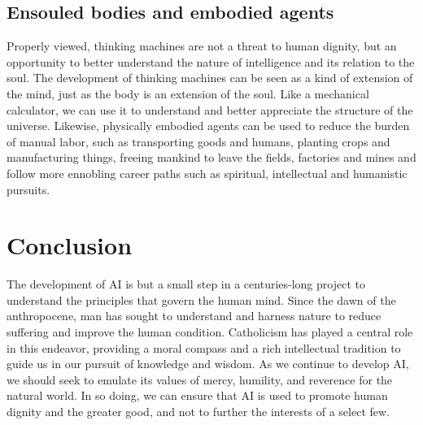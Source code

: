 \documentclass[sigplan,nonacm]{acmart}\settopmatter{printfolios=false,printccs=false,printacmref=false}
\begin{document}
  \subsection{Ensouled bodies and embodied agents}

  Properly viewed, thinking machines are not a threat to human dignity, but an opportunity to better understand the nature of intelligence and its relation to the soul. The development of thinking machines can be seen as a kind of extension of the mind, just as the body is an extension of the soul. Like a mechanical calculator, we can use it to understand and better appreciate the structure of the universe. Likewise, physically embodied agents can be used to reduce the burden of manual labor, such as transporting goods and humans, planting crops and manufacturing things, freeing mankind to leave the fields, factories and mines and follow more ennobling career paths such as spiritual, intellectual and humanistic pursuits.

  \section{Conclusion}

  The development of AI is but a small step in a centuries-long project to understand the principles that govern the human mind. Since the dawn of the anthropocene, man has sought to understand and harness nature to reduce suffering and improve the human condition. Catholicism has played a central role in this endeavor, providing a moral compass and a rich intellectual tradition to guide us in our pursuit of knowledge and wisdom. As we continue to develop AI, we should seek to emulate its values of mercy, humility, and reverence for the natural world. In so doing, we can ensure that AI is used to promote human dignity and the greater good, and not to further the interests of a select few.

  
\clearpage
\end{document}
